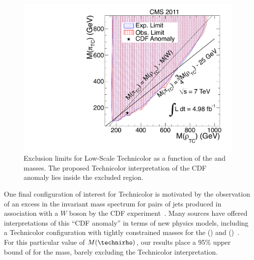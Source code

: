 \begin{figure}
  \centering
  \includegraphics[width=\plotwidth]{figures/tclimit-2d}
  \caption{Exclusion limits for Low-Scale Technicolor as a function of the \technirho and \technipi masses.  The proposed Technicolor interpretation of the CDF anomaly lies inside the excluded region.}
  \label{fig:tclimit-2d}
\end{figure}

One final configuration of interest for Technicolor is motivated by the observation of an excess in the invariant mass spectrum for pairs of jets produced in association with a $W$ boson by the CDF experiment~\cite{Aaltonen:2011mk}.  Many sources have offered interpretations of this ``CDF anomaly'' in terms of new physics models, including a Technicolor configuration with tightly constrained masses for the \technirho () and \technipi ()~\cite{Eichten:2012br}.  For this particular value of $M(\technirho)$, our results place a 95\% \conflevel{} upper bound of  for the \technipi mass, barely excluding the Technicolor interpretation.
